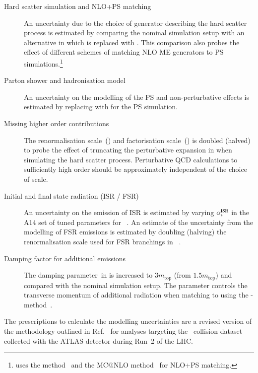 \begin{description}

\item[Hard scatter simulation and NLO+PS matching] An uncertainty due to the
  choice of generator describing the hard scatter process is estimated by
  comparing the nominal simulation setup with an alternative in which
  \POWHEGBOX[v2] is replaced with \MGNLO. This comparison also probes the effect
  of different schemes of matching NLO ME generators to PS
  simulations.\footnote{\POWHEGBOX[v2] uses the \POWHEG
    method~\cite{Nason:2004rx,Frixione:2007vw,Alioli:2010xd} and \MGNLO the
    MC@NLO method~\cite{Frixione:2002ik} for NLO+PS matching.}

\item[Parton shower and hadronisation model] An uncertainty on the modelling of
  the PS and non-perturbative effects is estimated by replacing \PYTHIA[8] with
  \HERWIG[7.0.4] for the PS simulation.

\item[Missing higher order contributions] The renormalisation scale~(\muR) and
  factorisation scale~(\muF) is doubled (halved) to probe the effect of
  truncating the perturbative expansion in \alphas when simulating the hard
  scatter process. Perturbative QCD calculations to sufficiently high order
  should be approximately independent of the choice of scale.

\item[Initial and final state radiation (ISR / FSR)] An uncertainty on the
  emission of ISR is estimated by varying $\alpha_{\text{s}}^\text{ISR}$ in the A14 set of
  tuned parameters for \PYTHIA[8]~\cite{ATL-PHYS-PUB-2014-021}.
  An estimate of the uncertainty from the modelling of FSR emissions is
  estimated by doubling (halving) the renormalisation scale used for FSR
  branchings in
  \PYTHIA[8]~\cite{Sjostrand:2014zea,Mrenna:2016sih,pythia-variations-online}.

\item[Damping factor for additional emissions] The damping parameter~\hdamp in
  \POWHEGBOX[v2] is increased to $3 m_\text{top}$ (from $1.5 m_\text{top}$) and
  compared with the nominal simulation setup. The \hdamp parameter controls the
  transverse momentum of additional radiation when matching \POWHEGBOX[v2] to
  \PYTHIA[8] using the
  \POWHEG-method~\cite{ATL-PHYS-PUB-2016-020,ATL-PHYS-PUB-2020-023}.

\end{description}
The prescriptions to calculate the \ttbar modelling uncertainties are a revised
version of the methodology outlined in Ref.~\cite{ATL-PHYS-PUB-2020-023} for
analyses targeting the \pp~collision dataset collected with the ATLAS detector
during Run~2 of the LHC.

